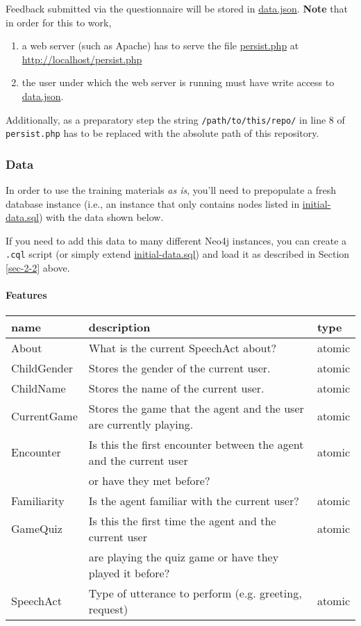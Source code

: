 \documentclass[11pt]{article}
\begin{document}
Feedback submitted via the questionnaire will be stored in
\href{training-materials/questionaire/answers/data.json}{data.json}. \textbf{Note} that in order for this to work,

\begin{enumerate}
\item a web server (such as Apache) has to serve the file \href{training-materials/questionaire/persist.php}{persist.php}
      at \url{http://localhost/persist.php}
\item the user under which the web server is running must have write
access to \href{training-materials/questionaire/answers/data.json}{data.json}.
\end{enumerate}

Additionally, as a preparatory step the string
\texttt{/path/to/this/repo/} in line 8 of \texttt{persist.php} has to be
replaced with the absolute path of this repository.

\subsubsection{Data}
\label{sec-3-4-1}
In order to use the training materials \emph{as is}, you'll need to
prepopulate a fresh database instance (i.e., an instance that only
contains nodes listed in \href{initial-data.cql}{initial-data.sql}) with the data shown
below.

If you need to add this data to many different Neo4j instances,
you can create a \texttt{.cql} script (or simply extend \href{initial-data.cql}{initial-data.sql})
and load it as described in Section \ref{sec-2-2} above.

\paragraph{Features}
\label{sec-3-4-1-1}
\begin{center}
\begin{tabular}{lll}
\hline
\textbf{name} & \textbf{description} & \textbf{type}\\
\hline
About & What is the current SpeechAct about? & atomic\\
ChildGender & Stores the gender of the current user. & atomic\\
ChildName & Stores the name of the current user. & atomic\\
CurrentGame & Stores the game that the agent and the user are currently playing. & atomic\\
Encounter & Is this the first encounter between the agent and the current user & atomic\\
 & or have they met before? & \\
Familiarity & Is the agent familiar with the current user? & atomic\\
GameQuiz & Is this the first time the agent and the current user & atomic\\
 & are playing the quiz game or have they played it before? & \\
SpeechAct & Type of utterance to perform (e.g. greeting, request) & atomic\\
\hline
\end{tabular}
\end{center}
\end{document}
